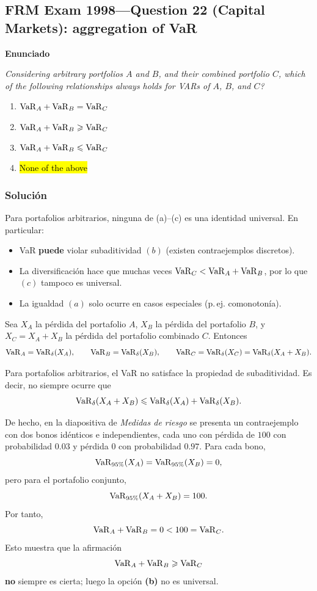 ﻿\subsection{FRM Exam 1998---Question 22 (Capital Markets): aggregation of VaR}

\textbf{Enunciado}

\emph{Considering arbitrary portfolios \(A\) and \(B\), and their combined portfolio \(C\),
which of the following relationships always holds for VARs of \(A\), \(B\), and \(C\)?}
\begin{enumerate}[label=\alph*.]
\item \( \mathrm{VaR}_A+\mathrm{VaR}_B=\mathrm{VaR}_C\)
\item \( \mathrm{VaR}_A+\mathrm{VaR}_B\geqslant \mathrm{VaR}_C\)
\item \( \mathrm{VaR}_A+\mathrm{VaR}_B\leqslant \mathrm{VaR}_C\)
\item \hl{None of the above}
\end{enumerate}

\subsubsection*{Solución}

Para portafolios arbitrarios, ninguna de (a)--(c) es una identidad universal. En particular:
\begin{itemize}
\item VaR \textbf{puede} violar subaditividad \((b)\) (existen contraejemplos discretos).
\item La diversificación hace que muchas veces \(\mathrm{VaR}_C<\mathrm{VaR}_A+\mathrm{VaR}_B\), por lo que \((c)\) tampoco es universal.
\item La igualdad \((a)\) solo ocurre en casos especiales (p.\,ej. comonotonía).
\end{itemize}

Sea \(X_A\) la pérdida del portafolio \(A\), \(X_B\) la pérdida del portafolio \(B\), y
\(X_C=X_A+X_B\) la pérdida del portafolio combinado \(C\). Entonces
\[
\mathrm{VaR}_A=\mathrm{VaR}_\delta(X_A),\qquad
\mathrm{VaR}_B=\mathrm{VaR}_\delta(X_B),\qquad
\mathrm{VaR}_C=\mathrm{VaR}_\delta(X_C)=\mathrm{VaR}_\delta(X_A+X_B).
\]

Para portafolios arbitrarios, el VaR no satisface la propiedad de subaditividad. Es decir, no siempre ocurre que
\[
\mathrm{VaR}_\delta(X_A+X_B)\leqslant \mathrm{VaR}_\delta(X_A)+\mathrm{VaR}_\delta(X_B).
\]

De hecho, en la diapositiva de \emph{Medidas de riesgo} se presenta un contraejemplo
con dos bonos idénticos e independientes, cada uno con pérdida de \(100\) con
probabilidad \(0.03\) y pérdida \(0\) con probabilidad \(0.97\). Para cada bono,
\[
\mathrm{VaR}_{95\%}(X_A)=\mathrm{VaR}_{95\%}(X_B)=0,
\]
pero para el portafolio conjunto,
\[
\mathrm{VaR}_{95\%}(X_A+X_B)=100.
\]
Por tanto,
\[
\mathrm{VaR}_A+\mathrm{VaR}_B=0<100=\mathrm{VaR}_C.
\]
Esto muestra que la afirmación
\[
\mathrm{VaR}_A+\mathrm{VaR}_B\geqslant \mathrm{VaR}_C
\]
\textbf{no} siempre es cierta; luego la opción \textbf{(b)} no es universal.

